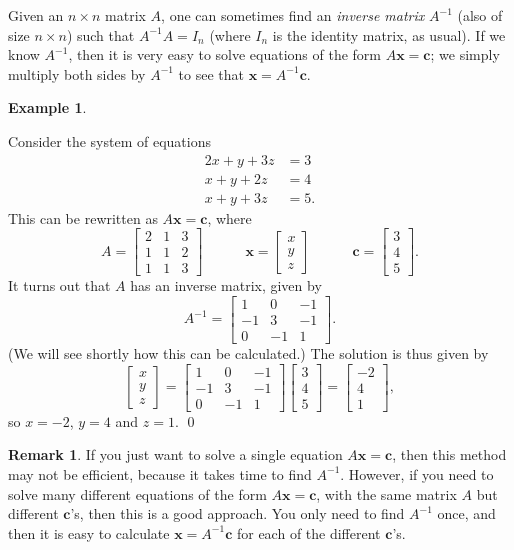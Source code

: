 \documentclass[a4paper]{book}
\newcommand{\PURPLE}[1]{{\color{purple}#1}}
\newcommand{\bbm}       {\begin{bmatrix}}
\newcommand{\ebm}       {\end{bmatrix}}
\newcommand{\tm}        {\times}
\newcommand{\VEC}[1]    {\mathbf{#1}}
\renewcommand{\:}{\colon}
\newcommand{\bilabel}[1]{\hypertarget{#1}{\label{#1}}}
\newcommand{\DEFN}[1]{\PURPLE{\emph{#1}}}
\theoremstyle{definition}
\newtheorem{remark}[theorem]{Remark}
\newtheorem{example}[theorem]{Example}
\begin{document}
Given an $n\tm n$ matrix $A$, one can sometimes find an 
\DEFN{inverse matrix} $A^{-1}$ (also of size $n\tm n$) such that
$A^{-1}A=I_n$ (where $I_n$ is the identity matrix, as usual).  If we
know $A^{-1}$, then it is very easy to solve equations of the form
$A\VEC{x}=\VEC{c}$; we simply multiply both sides by $A^{-1}$ to see
that $\VEC{x}=A^{-1}\VEC{c}$.
\begin{example}\bilabel{eg-lineq-inv}
 Consider the system of equations
 \begin{align*}
  2x + y + 3z &= 3 \\
   x + y + 2z &= 4 \\
   x + y + 3z &= 5.
 \end{align*}
 This can be rewritten as $A\VEC{x}=\VEC{c}$, where 
 \[ A = \bbm 2&1&3\\ 1&1&2\\ 1&1&3 \ebm \hspace{3em}
    \VEC{x} = \bbm x\\ y\\ z\ebm \hspace{3em}
    \VEC{c} = \bbm 3\\ 4\\ 5\ebm.
 \]
 It turns out that $A$ has an inverse matrix, given by
 \[ A^{-1} = \bbm 1&0&-1\\ -1&3&-1\\ 0&-1&1\ebm. \]
 (We will see shortly how this can be calculated.)  The solution is
 thus given by
 \[ \bbm x\\ y\\ z\ebm = 
     \bbm 1&0&-1\\ -1&3&-1\\ 0&-1&1\ebm \bbm 3\\4\\5 \ebm = 
      \bbm -2\\ 4\\ 1\ebm,
 \]
 so $x=-2$, $y=4$ and $z=1$.
 \qed
\end{example}
\begin{remark}
 If you just want to solve a single equation $A\VEC{x}=\VEC{c}$, then
 this method may not be efficient, because it takes time to find
 $A^{-1}$.  However, if you need to solve many different equations of
 the form $A\VEC{x}=\VEC{c}$, with the same matrix $A$ but different
 $\VEC{c}$'s, then this is a good approach.  You only need to find
 $A^{-1}$ once, and then it is easy to calculate
 $\VEC{x}=A^{-1}\VEC{c}$ for each of the different $\VEC{c}$'s.
\end{remark}
\end{document}
